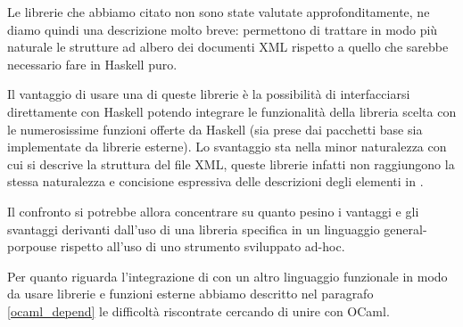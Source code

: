 Le librerie che abbiamo citato non sono state valutate approfonditamente, ne diamo quindi una descrizione molto breve: permettono di trattare in modo più naturale le strutture ad albero dei documenti XML rispetto a quello che sarebbe necessario fare in Haskell puro.

Il vantaggio di usare una di queste librerie è la possibilità di interfacciarsi direttamente con Haskell potendo integrare le funzionalità della libreria scelta con le numerosissime funzioni offerte da Haskell (sia prese dai pacchetti base sia implementate da librerie esterne). Lo svantaggio sta nella minor naturalezza con cui si descrive la struttura del file XML, queste librerie infatti non raggiungono la stessa naturalezza e concisione espressiva delle descrizioni degli elementi in \cduce.

Il confronto si potrebbe allora concentrare su quanto pesino i vantaggi e gli svantaggi derivanti dall'uso di una libreria specifica in un linguaggio general-porpouse rispetto all'uso di uno strumento sviluppato ad-hoc.

Per quanto riguarda l'integrazione di \cduce con un altro linguaggio funzionale in modo da usare librerie e funzioni esterne abbiamo descritto nel paragrafo \ref{ocaml_depend} le difficoltà riscontrate cercando di unire \cduce con OCaml.
